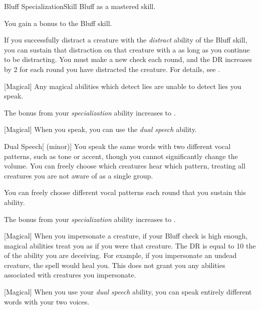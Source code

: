     \begin{feat}{Bluff Specialization}{Skill}
        \featpre Bluff as a mastered skill.

         You gain a  bonus to the Bluff skill.

         If you successfully distract a creature with the \textit{distract} ability of the Bluff skill, you can sustain that distraction on that creature with a  as long as you continue to be distracting.
        You must make a new check each round, and the DR increases by 2 for each round you have distracted the creature.
        For details, see .

        [Magical] Any magical abilities which detect lies are unable to detect lies you speak.

         The bonus from your \textit{specialization} ability increases to .

        [Magical] When you speak, you can use the \textit{dual speech} ability.
        \begin{apability}{Dual Speech}[ (minor)]
            You speak the same words with two different vocal patterns, such as tone or accent, though you cannot significantly change the volume.
            You can freely choose which creatures hear which pattern, treating all creatures you are not aware of as a single group.

            You can freely choose different vocal patterns each round that you sustain this ability.
        \end{apability}

         The bonus from your \textit{specialization} ability increases to .

        [Magical] When you impersonate a creature, if your Bluff check is high enough, magical abilities treat you as if you were that creature.
        The DR is equal to 10 \add the  of the ability you are deceiving.
        For example, if you impersonate an undead creature, the  spell would heal you.
        This does not grant you any abilities associated with creatures you impersonate.

        [Magical] When you use your \textit{dual speech} ability, you can speak entirely different words with your two voices.
    \end{feat}

